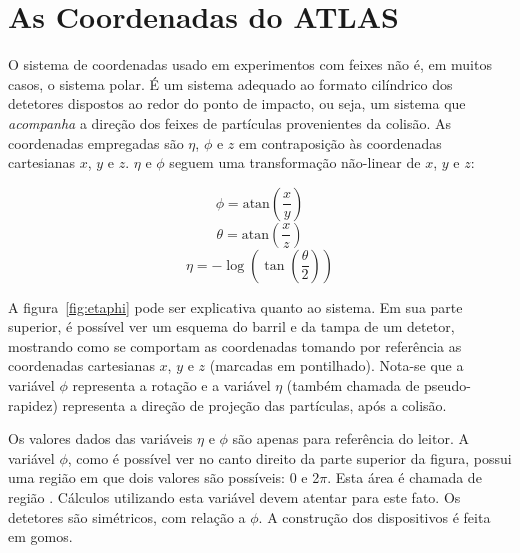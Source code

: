\typeout{ ====================================================================}
\typeout{ ====================================================================}

\chapter{As Coordenadas do ATLAS}
\label{ap:coord}

O sistema de coordenadas usado em experimentos com feixes não é, em muitos
casos, o sistema polar. É um sistema adequado ao formato cilíndrico dos
detetores dispostos ao redor do ponto de impacto, ou seja, um sistema que
\emph{acompanha} a direção dos feixes de partículas provenientes da
colisão. As coordenadas empregadas são $\eta$, $\phi$ e $z$ em contraposição
às coordenadas cartesianas $x$, $y$ e $z$. $\eta$ e $\phi$ seguem uma
transformação não-linear de $x$, $y$ e $z$:

\begin{equation}
\phi = \text{atan}({\frac{x}{y}})
\end{equation}
\begin{equation}
\theta = \text{atan}({\frac{x}{z}})
\end{equation}
\begin{equation}
\eta = - \log({\tan({\frac{\theta}{2}})})
\end{equation}

A figura~\ref{fig:etaphi} pode ser explicativa quanto ao sistema. Em sua parte
superior, é possível ver um esquema do barril e da tampa de um detetor,
mostrando como se comportam as coordenadas tomando por referência as
coordenadas cartesianas $x$, $y$ e $z$ (marcadas em pontilhado). Nota-se que a
variável $\phi$ representa a rotação e a variável $\eta$ (também chamada de
pseudo-rapidez) representa a direção de projeção das
partículas, após a colisão.

Os valores dados das variáveis $\eta$ e $\phi$ são apenas para referência do
leitor. A variável $\phi$, como é possível ver no canto direito da parte
superior da figura, possui uma região em que dois valores são possíveis: 0 e
2$\pi$. Esta área é chamada de região . Cálculos utilizando
esta variável devem atentar para este fato. Os detetores são simétricos, com
relação a $\phi$. A construção dos dispositivos é feita em gomos.

